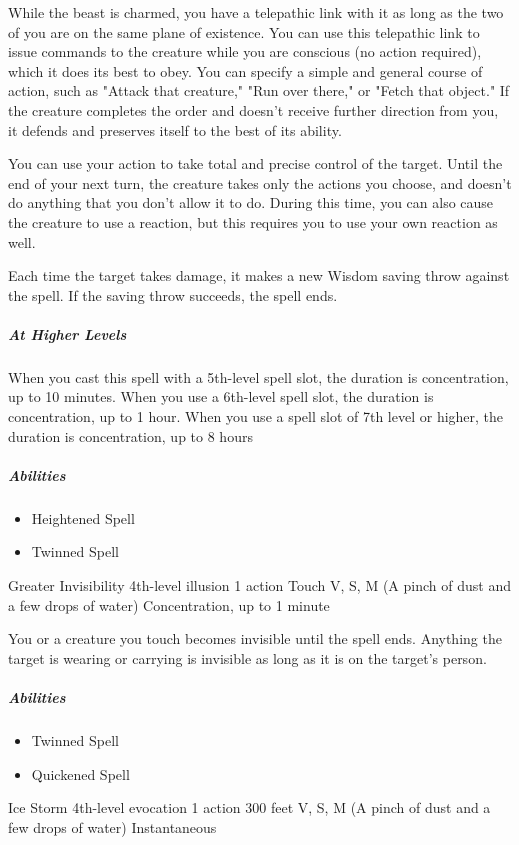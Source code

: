 \documentclass[letterpaper,openany,oneside,twocolumn]{book}
\begin{document}
While the beast is charmed, you have a telepathic link with it as long as the two of you are on the same plane of existence. You can use this telepathic link to issue commands to the creature while you are conscious (no action required), which it does its best to obey. You can specify a simple and  general course of action, such as "Attack that creature," "Run over there," or  "Fetch that object." If the creature completes the order and doesn't receive further direction from you, it defends and preserves itself to the best of its ability. 

You can use your action to take total and precise control of the  target. Until the end of your next turn, the creature takes only the actions you choose, and doesn't do anything that you don't allow it to do. During this time, you can also cause the creature to use a reaction, but this requires you to use your own reaction as well. 

Each time the target takes damage, it makes a new Wisdom saving throw against the spell. If the saving throw succeeds, the spell ends.

\subparagraph*{At Higher Levels} When you cast this spell with a 5th-level spell slot, the duration is concentration, up to 10 minutes.  When you use a 6th-level spell slot, the duration is concentration, up to 1 hour. When you use a spell slot of 7th level or higher, the duration is concentration, up to 8 hours

\subparagraph*{Abilities}
\begin{itemize}
  \item Heightened Spell
  \item Twinned Spell
\end{itemize}

\DndSpellHeader
  {Greater Invisibility}
  {4th-level illusion}
  {1 action}
  {Touch}
  {V, S, M (A pinch of dust and a few drops of water)}
  {Concentration, up to 1 minute}

You or a creature you touch becomes invisible until the spell ends. Anything the target is wearing or carrying is invisible as long as it is on the target's person.

\subparagraph*{Abilities}
\begin{itemize}
  \item Twinned Spell
  \item Quickened Spell
\end{itemize}

\DndSpellHeader
  {Ice Storm}
  {4th-level evocation}
  {1 action}
  {300 feet}
  {V, S, M (A pinch of dust and a few drops of water)}
  {Instantaneous}
\end{document}
